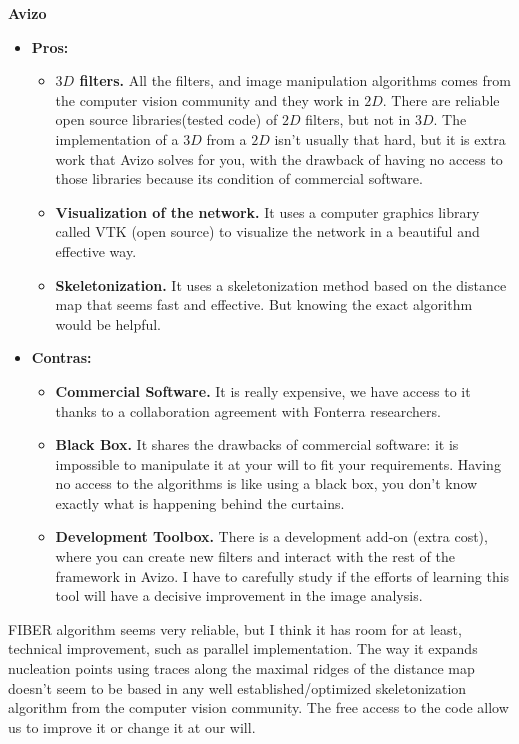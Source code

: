 {\large\textbf{Avizo}}
\begin{itemize}
  \item \textbf{Pros:}


\begin{itemize}
  \item \textbf{$3D$ filters.} All the filters, and image manipulation
  algorithms comes from the computer vision community and they work in $2D$.
  There are reliable open source libraries(tested code) of $2D$ filters, but
  not in $3D$.
  The implementation of a $3D$ from a $2D$ isn't usually that hard, but it is
  extra work that Avizo solves for you, with the drawback of having no access to
  those libraries because its condition of commercial software.
   \item \textbf{Visualization of the network.} It uses a computer graphics
   library called VTK (open source) to visualize the network in a beautiful and
   effective way.
   \item \textbf{Skeletonization.} It uses a skeletonization method based on the
   distance map that seems fast and effective. But knowing the exact algorithm
   would be helpful.
\end{itemize}
\item \textbf{Contras:}
\begin{itemize}
  \item \textbf{Commercial Software.} It is really expensive, we have access to
  it thanks to a collaboration agreement with Fonterra researchers. 
  \item \textbf{Black Box.} It
  shares the drawbacks of commercial software: it is impossible to
  manipulate it at your will to fit your requirements. Having no access to the
  algorithms is like using a black box, you don't know exactly what is
  happening behind the curtains. 
  \item \textbf{Development Toolbox.} There is a development add-on (extra
  cost), where you can create new filters and interact with the rest of the framework
  in Avizo. I have to carefully study if the efforts of learning this tool will
  have a decisive improvement in the image analysis.
\end{itemize}
\end{itemize}
FIBER algorithm seems very reliable, but I think it has
room for at least, technical improvement, such as parallel implementation.
The way it expands nucleation points using traces along the maximal ridges
of the distance map doesn't seem to be based in any well
established/optimized skeletonization algorithm from the computer vision
community. The free access to the code allow us to improve it or change it at our will.

